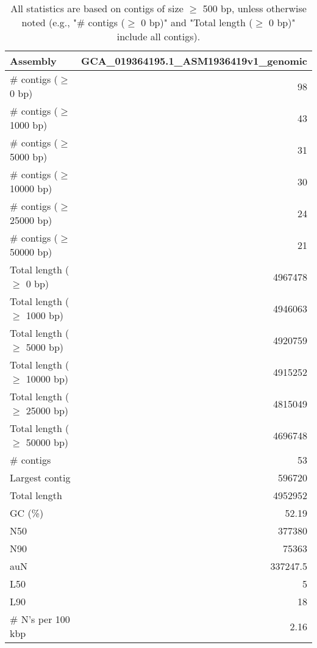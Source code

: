 \documentclass[12pt,a4paper]{article}
\begin{document}
\begin{table}[ht]
\begin{center}
\caption{All statistics are based on contigs of size $\geq$ 500 bp, unless otherwise noted (e.g., "\# contigs ($\geq$ 0 bp)" and "Total length ($\geq$ 0 bp)" include all contigs).}
\begin{tabular}{|l*{1}{|r}|}
\hline
Assembly & GCA\_019364195.1\_ASM1936419v1\_genomic \\ \hline
\# contigs ($\geq$ 0 bp) & 98 \\ \hline
\# contigs ($\geq$ 1000 bp) & 43 \\ \hline
\# contigs ($\geq$ 5000 bp) & 31 \\ \hline
\# contigs ($\geq$ 10000 bp) & 30 \\ \hline
\# contigs ($\geq$ 25000 bp) & 24 \\ \hline
\# contigs ($\geq$ 50000 bp) & 21 \\ \hline
Total length ($\geq$ 0 bp) & 4967478 \\ \hline
Total length ($\geq$ 1000 bp) & 4946063 \\ \hline
Total length ($\geq$ 5000 bp) & 4920759 \\ \hline
Total length ($\geq$ 10000 bp) & 4915252 \\ \hline
Total length ($\geq$ 25000 bp) & 4815049 \\ \hline
Total length ($\geq$ 50000 bp) & 4696748 \\ \hline
\# contigs & 53 \\ \hline
Largest contig & 596720 \\ \hline
Total length & 4952952 \\ \hline
GC (\%) & 52.19 \\ \hline
N50 & 377380 \\ \hline
N90 & 75363 \\ \hline
auN & 337247.5 \\ \hline
L50 & 5 \\ \hline
L90 & 18 \\ \hline
\# N's per 100 kbp & 2.16 \\ \hline
\end{tabular}
\end{center}
\end{table}
\end{document}
